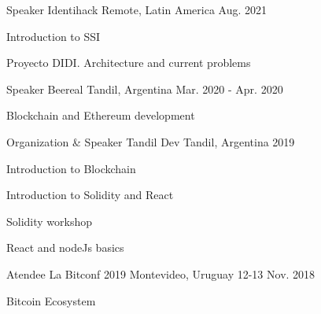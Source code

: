 \begin{cventries}
\cventry
{Speaker} %
{Identihack} %
{Remote, Latin America} %
{Aug. 2021} %
{ %
\begin{cvitems}
\item {Introduction to SSI}
\item {Proyecto DIDI. Architecture and current problems}
\end{cvitems}
}
\cventry
{Speaker} %
{Beereal} %
{Tandil, Argentina} %
{Mar. 2020 - Apr. 2020} %
{ %
\begin{cvitems}
\item {Blockchain and Ethereum development}
\end{cvitems}
}
\cventry
{Organization \& Speaker} %
{Tandil Dev} %
{Tandil, Argentina} %
{2019} %
{ %
\begin{cvitems}
\item {Introduction to Blockchain}
\item {Introduction to Solidity and React}
\item {Solidity workshop}
\item {React and nodeJs basics}
\end{cvitems}
}
\cventry
{Atendee} %
{La Bitconf 2019} %
{Montevideo, Uruguay} %
{12-13 Nov. 2018} %
{ %
\begin{cvitems}
\item {Bitcoin Ecosystem}
\end{cvitems}
}
\end{cventries}

